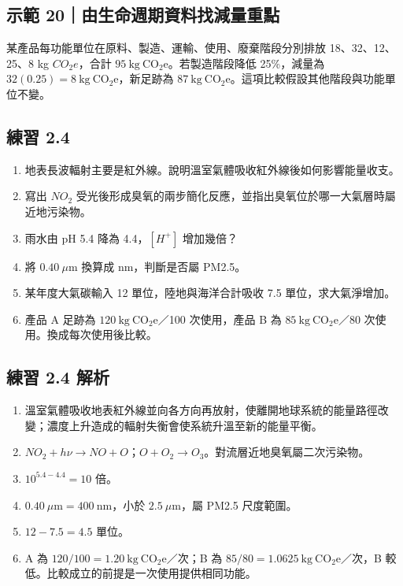 \documentclass[11pt,a4paper]{article}
\providecommand{\tightlist}{%
  \setlength{\itemsep}{0pt}\setlength{\parskip}{0pt}}
\begin{document}
\begin{HandoutWorkedExample}

\subsection{示範 20｜由生命週期資料找減量重點}\label{ux793aux7bc4-20ux7531ux751fux547dux9031ux671fux8cc7ux6599ux627eux6e1bux91cfux91cdux9ede}

某產品每功能單位在原料、製造、運輸、使用、廢棄階段分別排放 18、32、12、25、8 kg \(CO_2e\)，合計 \(95\ \mathrm{kg\ CO_2e}\)。若製造階段降低 25\%，減量為 \(32(0.25)=8\ \mathrm{kg\ CO_2e}\)，新足跡為 \(87\ \mathrm{kg\ CO_2e}\)。這項比較假設其他階段與功能單位不變。

\end{HandoutWorkedExample}

\subsection{練習 2.4}\label{ux7df4ux7fd2-2.4}

\begin{enumerate}
\def\labelenumi{\arabic{enumi}.}
\tightlist
\item
  地表長波輻射主要是紅外線。說明溫室氣體吸收紅外線後如何影響能量收支。
\item
  寫出 \(NO_2\) 受光後形成臭氧的兩步簡化反應，並指出臭氧位於哪一大氣層時屬近地污染物。
\item
  雨水由 pH 5.4 降為 4.4，\([H^+]\) 增加幾倍？
\item
  將 \(0.40\ \mu\mathrm m\) 換算成 nm，判斷是否屬 PM2.5。
\item
  某年度大氣碳輸入 12 單位，陸地與海洋合計吸收 7.5 單位，求大氣淨增加。
\item
  產品 A 足跡為 \(120\ \mathrm{kg\ CO_2e}\)／100 次使用，產品 B 為 \(85\ \mathrm{kg\ CO_2e}\)／80 次使用。換成每次使用後比較。
\end{enumerate}

\subsection{練習 2.4 解析}\label{ux7df4ux7fd2-2.4-ux89e3ux6790}

\begin{enumerate}
\def\labelenumi{\arabic{enumi}.}
\tightlist
\item
  溫室氣體吸收地表紅外線並向各方向再放射，使離開地球系統的能量路徑改變；濃度上升造成的輻射失衡會使系統升溫至新的能量平衡。
\item
  \(NO_2+h\nu\rightarrow NO+O\)；\(O+O_2\rightarrow O_3\)。對流層近地臭氧屬二次污染物。
\item
  \(10^{5.4-4.4}=10\) 倍。
\item
  \(0.40\ \mu\mathrm m=400\ \mathrm{nm}\)，小於 \(2.5\ \mu\mathrm m\)，屬 PM2.5 尺度範圍。
\item
  \(12-7.5=4.5\) 單位。
\item
  A 為 \(120/100=1.20\ \mathrm{kg\ CO_2e}\)／次；B 為 \(85/80=1.0625\ \mathrm{kg\ CO_2e}\)／次，B 較低。比較成立的前提是一次使用提供相同功能。
\end{enumerate}
\end{document}
